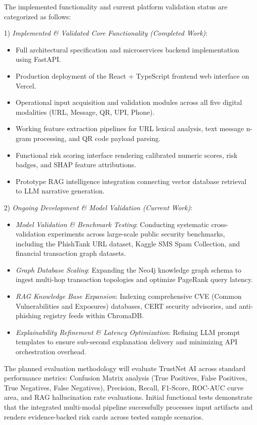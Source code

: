 \documentclass[conference,a4paper]{IEEEtran}
\begin{document}
The implemented functionality and current platform validation status are categorized as follows:

1) \textit{Implemented \& Validated Core Functionality (Completed Work)}:
\begin{itemize}
    \item Full architectural specification and microservices backend implementation using FastAPI.
    \item Production deployment of the React + TypeScript frontend web interface on Vercel.
    \item Operational input acquisition and validation modules across all five digital modalities (URL, Message, QR, UPI, Phone).
    \item Working feature extraction pipelines for URL lexical analysis, text message n-gram processing, and QR code payload parsing.
    \item Functional risk scoring interface rendering calibrated numeric scores, risk badges, and SHAP feature attributions.
    \item Prototype RAG intelligence integration connecting vector database retrieval to LLM narrative generation.
\end{itemize}

2) \textit{Ongoing Development \& Model Validation (Current Work)}:
\begin{itemize}
    \item \textit{Model Validation \& Benchmark Testing}: Conducting systematic cross-validation experiments across large-scale public security benchmarks, including the PhishTank URL dataset, Kaggle SMS Spam Collection, and financial transaction graph datasets.
    \item \textit{Graph Database Scaling}: Expanding the Neo4j knowledge graph schema to ingest multi-hop transaction topologies and optimize PageRank query latency.
    \item \textit{RAG Knowledge Base Expansion}: Indexing comprehensive CVE (Common Vulnerabilities and Exposures) databases, CERT security advisories, and anti-phishing registry feeds within ChromaDB.
    \item \textit{Explainability Refinement \& Latency Optimization}: Refining LLM prompt templates to ensure sub-second explanation delivery and minimizing API orchestration overhead.
\end{itemize}

The planned evaluation methodology will evaluate TrustNet AI across standard performance metrics: Confusion Matrix analysis (True Positives, False Positives, True Negatives, False Negatives), Precision, Recall, F1-Score, ROC-AUC curve area, and RAG hallucination rate evaluations. Initial functional tests demonstrate that the integrated multi-modal pipeline successfully processes input artifacts and renders evidence-backed risk cards across tested sample scenarios.
\end{document}
